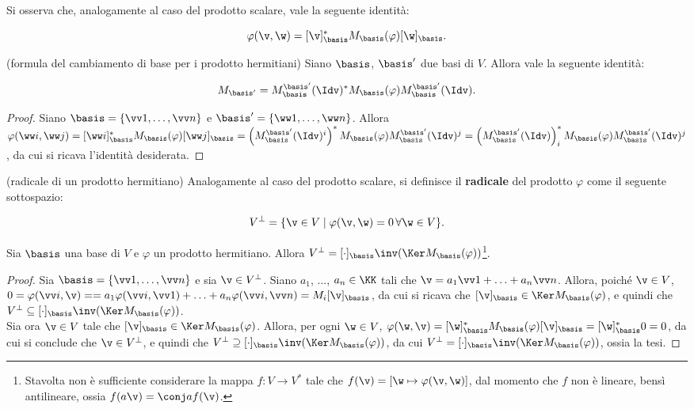 \documentclass[11pt]{article}
\begin{document}
	\begin{remark}
		Si osserva che, analogamente al caso del prodotto scalare, vale
		la seguente identità:
		
		\[ \varphi(\v, \w) = [\v]_\basis^* M_\basis(\varphi) [\w]_\basis. \]
	\end{remark}
	
	\begin{proposition}
		(formula del cambiamento di base per i prodotto hermitiani) Siano
		$\basis$, $\basis'$ due basi di $V$. Allora vale la seguente
		identità:
		
		\[ M_{\basis'} = M_{\basis}^{\basis'}(\Idv)^* M_\basis(\varphi) M_{\basis}^{\basis'}(\Idv). \]
	\end{proposition}

	\begin{proof}
		Siano $\basis = \{ \vv 1, \ldots, \vv n \}$ e $\basis' = \{ \ww 1, \ldots, \ww n \}$. Allora $\varphi(\ww i, \ww j) = [\ww i]_\basis^* M_\basis(\varphi) [\ww j]_\basis = \left( M_\basis^{\basis'}(\Idv)^i \right)^* M_\basis(\varphi) M_\basis^{\basis'}(\Idv)^j =
		\left(M_\basis^{\basis'}(\Idv)\right)^*_i M_\basis(\varphi) M_\basis^{\basis'}(\Idv)^j$, da cui si ricava l'identità
		desiderata.
	\end{proof}

	\begin{definition} (radicale di un prodotto hermitiano)
		Analogamente al caso del prodotto scalare, si definisce il \textbf{radicale} del prodotto $\varphi$ come il seguente sottospazio: 
		
		\[ V^\perp = \{ \v \in V \mid \varphi(\v, \w) = 0 \, \forall \w \in V \}. \]
	\end{definition}

	\begin{proposition}
		Sia $\basis$ una base di $V$ e $\varphi$ un prodotto hermitiano. Allora $V^\perp = [\cdot]_\basis \inv (\Ker M_\basis(\varphi))$\footnote{Stavolta non è sufficiente considerare la mappa $f : V \to V^*$ tale che $f(\v) = \left[ \w \mapsto \varphi(\v, \w) \right]$, dal momento che $f$ non è lineare, bensì antilineare, ossia $f(a \v) = \conj a f(\v)$.}.
	\end{proposition}

	\begin{proof}
		Sia $\basis = \{ \vv 1, \ldots, \vv n \}$ e sia $\v \in V^\perp$.
		Siano $a_1$, ..., $a_n \in \KK$ tali che $\v = a_1 \vv 1 + \ldots + a_n \vv n$. Allora, poiché $\v \in V$, $0 = \varphi(\vv i, \v) =
		= a_1 \varphi(\vv i, \vv 1) + \ldots + a_n \varphi(\vv i, \vv n) = M_i [\v]_\basis$, da cui si ricava che $[\v]_\basis \in \Ker M_\basis(\varphi)$, e quindi che $V^\perp \subseteq [\cdot]_\basis \inv (\Ker M_\basis(\varphi))$. \\
		
		Sia ora $\v \in V$ tale che $[\v]_\basis \in \Ker M_\basis(\varphi)$.
		Allora, per ogni $\w \in V$, $\varphi(\w, \v) = [\w]_\basis^* M_\basis(\varphi) [\v]_\basis = [\w]_\basis^* 0 = 0$, da cui si
		conclude che $\v \in V^\perp$, e quindi che  $V^\perp \supseteq [\cdot]_\basis \inv (\Ker M_\basis(\varphi))$, da cui
		$V^\perp = [\cdot]_\basis \inv (\Ker M_\basis(\varphi))$, ossia
		la tesi.
	\end{proof}
\end{document}
